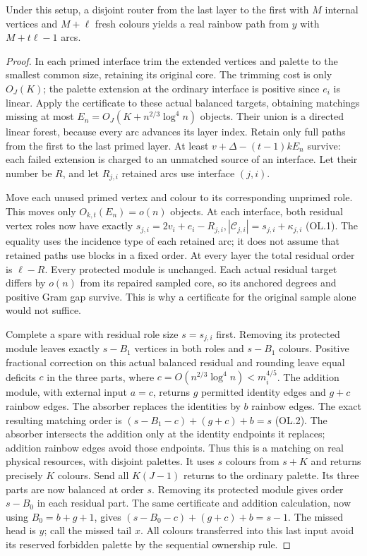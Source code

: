 \begin{lemma}\label{rou:ledger}
Under this setup, a disjoint router from the last layer to the first with $M$ internal vertices and $M+\ell$ fresh colours yields a real rainbow path from $y$ with $M+t\ell-1$ arcs.
\end{lemma}
\begin{proof}
In each primed interface trim the extended vertices and palette to
the smallest common size, retaining its original core. The trimming
cost is only $O_J(K)$; the palette extension at the ordinary interface is positive since $e_i$ is linear. Apply the certificate to these actual balanced targets, obtaining matchings missing at most $E_n=O_J(K+n^{2/3}\log^4n)$ objects. Their union is a directed linear forest, because every arc advances its layer index. Retain
only full paths from the first to the last primed layer. At least $v+\Delta-(t-1)kE_n$ survive: each failed extension is charged to an unmatched source of an interface. Let their number be $R$, and let $R_{j,i}$ retained arcs use interface $(j,i)$.

Move each unused primed vertex and colour to its corresponding
unprimed role. This moves only $O_{k,t}(E_n)=o(n)$ objects. At each interface, both residual vertex roles now have exactly $s_{j,i}=2v_i+e_i-R_{j,i},|\mathcal{C}_{j,i}|=s_{j,i}+\kappa_{j,i}$ \textup{(OL.1)}. The equality uses the incidence type of each retained arc; it does
not assume that retained paths use blocks in a fixed order. At every
layer the total residual order is $\ell-R$. Every protected module is unchanged. Each actual residual target differs by $o(n)$ from its repaired sampled core, so its anchored degrees and positive
Gram gap survive. This is why a certificate for the original sample
alone would not suffice.

Complete a spare with residual role size $s=s_{j,i}$ first. Removing its protected module leaves exactly $s-B_1$ vertices in both roles and $s-B_1$ colours. Positive fractional correction on this actual balanced residual and rounding leave equal deficits $c$ in the three parts, where $c=O(n^{2/3}\log^4n)<m_i^{4/5}$. The addition module, with external input $a=c$, returns $g$ permitted identity edges and $g+c$ rainbow edges. The absorber replaces the identities by $b$ rainbow edges. The exact resulting matching order is $(s-B_1-c)+(g+c)+b=s$ \textup{(OL.2)}. The absorber intersects the addition only at the identity endpoints
it replaces; addition rainbow edges avoid those endpoints. Thus this
is a matching on real physical resources, with disjoint palettes.
It uses $s$ colours from $s+K$ and returns precisely $K$ colours. Send all $K(J-1)$ returns to the ordinary palette. Its three parts are now balanced at order $s$. Removing its protected module gives order $s-B_0$ in each residual part. The same certificate and addition calculation, now using $B_0=b+g+1$, gives $(s-B_0-c)+(g+c)+b=s-1$. The missed head is $y$; call the missed tail $x$. All colours transferred into this last input avoid its reserved forbidden palette by the sequential ownership rule.


\end{proof}
